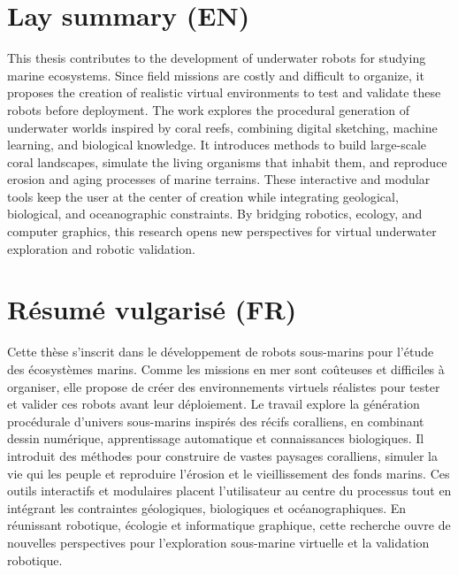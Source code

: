 \section*{Lay summary (EN)}
This thesis contributes to the development of underwater robots for studying marine ecosystems. Since field missions are costly and difficult to organize, it proposes the creation of realistic virtual environments to test and validate these robots before deployment. The work explores the procedural generation of underwater worlds inspired by coral reefs, combining digital sketching, machine learning, and biological knowledge. It introduces methods to build large-scale coral landscapes, simulate the living organisms that inhabit them, and reproduce erosion and aging processes of marine terrains. These interactive and modular tools keep the user at the center of creation while integrating geological, biological, and oceanographic constraints. By bridging robotics, ecology, and computer graphics, this research opens new perspectives for virtual underwater exploration and robotic validation.



\section*{Résumé vulgarisé (FR)}
Cette thèse s'inscrit dans le développement de robots sous-marins pour l'étude des écosystèmes marins. Comme les missions en mer sont coûteuses et difficiles à organiser, elle propose de créer des environnements virtuels réalistes pour tester et valider ces robots avant leur déploiement. Le travail explore la génération procédurale d'univers sous-marins inspirés des récifs coralliens, en combinant dessin numérique, apprentissage automatique et connaissances biologiques. Il introduit des méthodes pour construire de vastes paysages coralliens, simuler la vie qui les peuple et reproduire l'érosion et le vieillissement des fonds marins. Ces outils interactifs et modulaires placent l'utilisateur au centre du processus tout en intégrant les contraintes géologiques, biologiques et océanographiques. En réunissant robotique, écologie et informatique graphique, cette recherche ouvre de nouvelles perspectives pour l'exploration sous-marine virtuelle et la validation robotique.